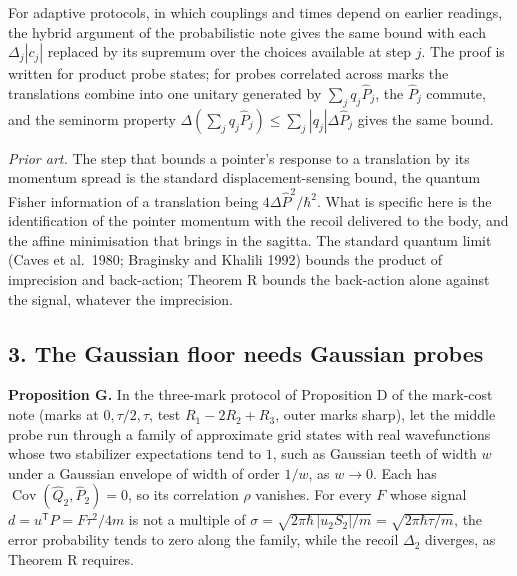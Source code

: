 \documentclass[11pt,a4paper]{article}
\begin{document}
For adaptive protocols, in which couplings and times depend on earlier
readings, the hybrid argument of the probabilistic note gives the same
bound with each \(\Delta_j|c_j|\) replaced by its supremum over the
choices available at step \(j\). The proof is written for product probe
states; for probes correlated across marks the translations combine into
one unitary generated by \(\sum_jq_j\hat P_j\), the \(\hat P_j\)
commute, and the seminorm property
\(\Delta(\sum_jq_j\hat P_j)\le\sum_j|q_j|\Delta\hat P_j\) gives the same
bound.

\emph{Prior art.} The step that bounds a pointer's response to a
translation by its momentum spread is the standard displacement-sensing
bound, the quantum Fisher information of a translation being
\(4\Delta\hat P^2/\hbar^2\). What is specific here is the identification
of the pointer momentum with the recoil delivered to the body, and the
affine minimisation that brings in the sagitta. The standard quantum
limit (Caves et al.~1980; Braginsky and Khalili 1992) bounds the product
of imprecision and back-action; Theorem R bounds the back-action alone
against the signal, whatever the imprecision.

\hypertarget{the-gaussian-floor-needs-gaussian-probes}{%
\subsection{3. The Gaussian floor needs Gaussian
probes}\label{the-gaussian-floor-needs-gaussian-probes}}

\textbf{Proposition G.} In the three-mark protocol of Proposition D of
the mark-cost note (marks at \(0,\tau/2,\tau\), test \(R_1-2R_2+R_3\),
outer marks sharp), let the middle probe run through a family of
approximate grid states with real wavefunctions whose two stabilizer
expectations tend to \(1\), such as Gaussian teeth of width \(w\) under
a Gaussian envelope of width of order \(1/w\), as \(w\to0\). Each has
\(\operatorname{Cov}(\hat Q_2,\hat P_2)=0\), so its correlation \(\rho\)
vanishes. For every \(F\) whose signal \(d=u^{\mathsf T}P=F\tau^2/4m\)
is not a multiple of
\(\sigma=\sqrt{2\pi\hbar\,|u_2S_2|/m}=\sqrt{2\pi\hbar\tau/m}\), the
error probability tends to zero along the family, while the recoil
\(\Delta_2\) diverges, as Theorem R requires.
\end{document}
